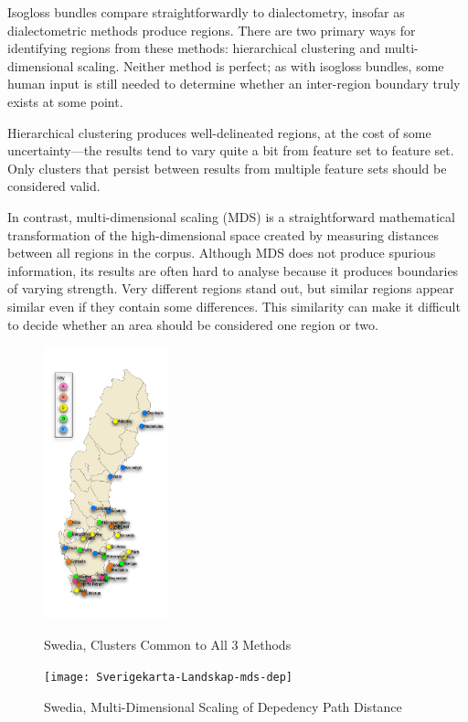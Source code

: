 Isogloss bundles compare straightforwardly to dialectometry, insofar as
dialectometric methods produce regions. There are two primary ways for
identifying regions from these methods: hierarchical clustering and
multi-dimensional scaling. Neither method is perfect; as with isogloss
bundles, some human input is still needed to determine whether an
inter-region boundary truly exists at some point.

Hierarchical clustering
produces well-delineated regions, at the cost of some
uncertainty---the results tend to vary quite a bit from feature set to
feature set. Only clusters that persist between results from multiple
feature sets should be considered valid.

In contrast, multi-dimensional scaling (MDS) is a straightforward
mathematical transformation of the high-dimensional space created by
measuring distances between all regions in the corpus. Although MDS
does not produce spurious information, its results are often hard to
analyse because it produces boundaries of varying strength. Very
different regions stand out, but similar regions appear similar even
if they contain some differences. This similarity can make it
difficult to decide whether an area should be considered one region or
two.

\begin{figure}
  \includegraphics[width=0.32\textwidth]{Sverigekarta-Landskap-Swedia}
  \label{agree-clusters-small}
  \caption{Swedia, Clusters Common to All 3 Methods}
\end{figure}

\begin{figure}
  \texttt{[image: Sverigekarta-Landskap-mds-dep]}
  \label{mds-dep-small}
  \caption{Swedia, Multi-Dimensional Scaling of Depedency Path Distance}
\end{figure}


